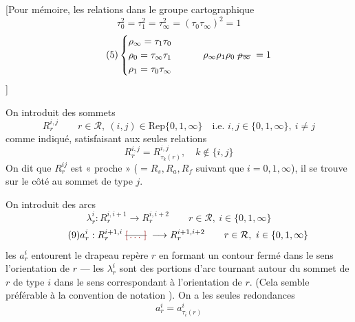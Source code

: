 \documentclass[11pt,a4paper]{article}
\begin{document}
[Pour mémoire, les relations dans le groupe cartographique
\begin{equation*}
  \tag{4}
  \tau_0^2 = \tau_1^2 = \tau_\infty^2 = (\tau_0 \tau_\infty)^2 = 1
\end{equation*}
\begin{equation*}
  \tag{5}
  \begin{cases}
    \rho_\infty = \tau_1 \tau_0 \\
    \rho_0 = \tau_\infty \tau_1 \\
    \rho_1 = \tau_0 \tau_\infty
  \end{cases}
  \qquad \rho_\infty \rho_1 \rho_0 \;\text{\struck{$\rho_\infty$}}\; = 1
\end{equation*}
]


On introduit des sommets
\begin{equation*}
  \tag{6} R^{i,j}_r \qquad r \in \mathcal{R},\ (i,j) \in \mathrm{Rep}\{0,1,\infty\}
  \quad \text{i.e.\ } i,j \in \{0,1,\infty\},\ i \neq j
\end{equation*}
comme indiqué, satisfaisant aux seules relations
\begin{equation*}
  \tag{7} \boxed{R^{i,j}_r = R^{i,j}_{\tau_k(r)}, \quad k \notin \{i,j\}}
\end{equation*}
On dit que $R^{ij}_r$ est « proche »    ($= R_s, R_a, R_f$ suivant que $i = 0, 1, \infty$), il se trouve sur le côté \struck{\ill{}}   au sommet de type $j$.

On introduit des arcs
\begin{equation*}
  \tag{8} \lambda^i_r : R^{i,i+1}_r \longrightarrow R^{i,i+2}_r \qquad r \in \mathcal{R},\ i \in \{0,1,\infty\}
\end{equation*}
\begin{equation*}
  \tag{9} a^i_r : R^{i+1,i}_r \;\text{\struck{\ill{}}}\; \longrightarrow R^{i+1,i+2}_r \qquad r \in \mathcal{R},\ i \in \{0,1,\infty\}
\end{equation*}
 les $a^i_r$ entourent le drapeau repère $r$ en formant un contour fermé dans le sens   l'orientation de $r$ ---  \struck{\ill{}} les $\lambda^i_r$  sont des portions d'arc tournant autour du sommet de $r$ de type $i$ dans le sens correspondant à l'orientation de $r$. (Cela \struck{\ill{}} semble préférable à la convention de notation ). On a les seules  redondances
\begin{equation*}
  \tag{10} \boxed{a^i_r = a^i_{\tau_i(r)}}
\end{equation*}
\end{document}
